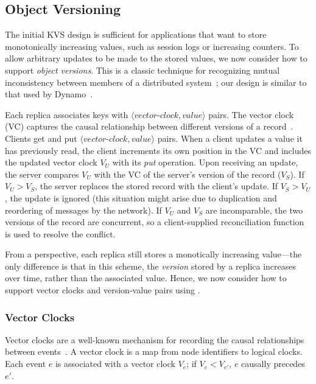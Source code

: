 \subsection{Object Versioning}
\label{sec:kvs-versions}

The initial KVS design is sufficient for applications that want to store
monotonically increasing values, such as session logs or increasing counters. To
allow arbitrary updates to be made to the stored values, we now consider how to
support \emph{object versions}. This is a classic technique for recognizing
mutual inconsistency between members of a distributed system~\cite{Parker1983};
our design is similar to that used by Dynamo~\cite{DeCandia2007}.

Each replica associates keys with
$\langle\textit{vector-clock},\textit{value}\rangle$ pairs. The vector clock
(VC) captures the causal relationship between different versions of a
record~\cite{Fidge1988,DeCandia2007}. Clients get and put
$\langle\textit{vector-clock},\textit{value}\rangle$ pairs. When a client
updates a value it has previously read, the client increments its own position
in the VC and includes the updated vector clock $V_U$ with its \emph{put}
operation. Upon receiving an update, the server compares $V_U$ with the VC of
the server's version of the record ($V_S$). If $V_U > V_S$, the server replaces
the stored record with the client's update. If $V_S > V_U$, the update is
ignored (this situation might arise due to duplication and reordering of
messages by the network). If $V_U$ and $V_S$ are incomparable, the two versions
of the record are concurrent, so a client-supplied reconciliation function is
used to resolve the conflict.

From a \lang perspective, each replica still stores a monotically increasing
value---the only difference is that in this scheme, the \emph{version} stored by
a replica increases over time, rather than the associated value. Hence, we now
consider how to support vector clocks and version-value pairs using \lang.

\subsubsection{Vector Clocks}
Vector clocks are a well-known mechanism for recording the causal relationships
between events~\cite{Fidge1988}. A vector clock is a map from node identifiers
to logical clocks. Each event $e$ is associated with a vector clock $V_e$; if
$V_e < V_{e'}$, $e$ causally precedes $e'$.

